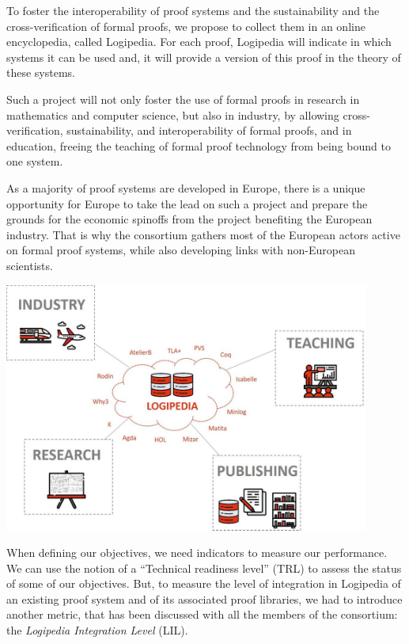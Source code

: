 To foster the interoperability of proof systems and the sustainability
and the cross-verification of formal proofs, we propose to collect
them in an online encyclopedia, called Logipedia.  For each proof,
Logipedia will indicate in which systems it can be used and, it will
provide a version of this proof in the theory of these systems.

Such a project will not only foster the use of formal proofs in
research in mathematics and computer science, but also in industry, by
allowing cross-verification, sustainability, and interoperability of
formal proofs, and in education, freeing the teaching of formal proof
technology from being bound to one system.

As a
majority of proof systems are developed in Europe, there is a unique
opportunity for Europe to take the lead on such a project and prepare
the grounds for the economic spinoffs from the project benefiting
the European industry. That is why the consortium gathers most of the
European actors active on formal proof systems, while also developing
links with non-European scientists.

\begin{center}
\includegraphics[width=12cm]{img/Schema-reduced}
\end{center}

When defining our objectives, we need indicators to measure our
performance.  We can use the notion of a ``Technical readiness level''
(TRL) to assess the status of some of our objectives.  But, to measure
the level of integration in Logipedia of an existing proof system and
of its associated proof libraries, we had to introduce another
metric, that has been discussed with all the members of the consortium:
the {\em Logipedia Integration Level} (LIL).

